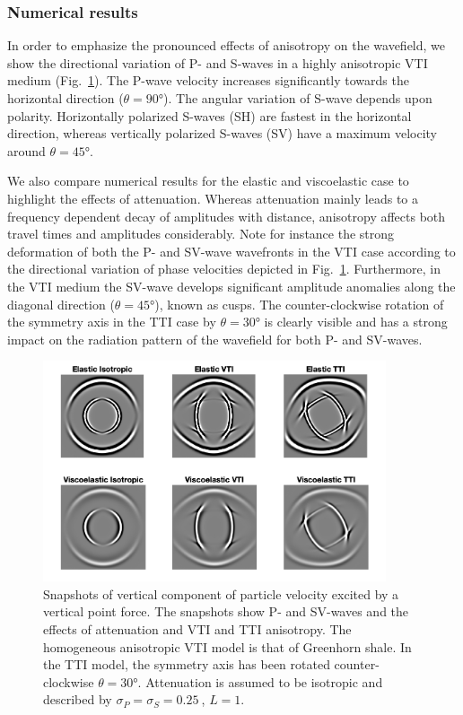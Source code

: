 \subsubsection{Numerical results}
In order to emphasize the pronounced effects of anisotropy on the wavefield, we show the directional variation of P- and S-waves in a highly anisotropic VTI medium (Fig.~\ref{fig:snapshots}). The P-wave velocity increases significantly towards the horizontal direction ($\theta = \ang{90}$). The angular variation of S-wave depends upon polarity. Horizontally polarized S-waves (SH) are fastest in the horizontal direction, whereas vertically polarized S-waves (SV) have a maximum velocity around $\theta = \ang{45}$.

We also compare numerical results for the elastic and viscoelastic
case to highlight the effects of attenuation. Whereas attenuation mainly leads to a frequency dependent decay of amplitudes with distance, anisotropy affects both travel times and amplitudes considerably. Note for instance the strong deformation of both the P- and SV-wave wavefronts in the VTI case according to the directional variation of phase velocities depicted in Fig.~\ref{fig:snapshots}. Furthermore, in the VTI medium the SV-wave develops significant amplitude anomalies along the diagonal direction ($\theta = \ang{45}$), known as cusps. The counter-clockwise rotation of the symmetry axis in the TTI case by $\theta = \ang{30}$ is clearly visible and has a strong impact on the radiation pattern of the wavefield for both P- and SV-waves.

\begin{figure}[h!]
    \centering
    \includegraphics[width=0.9\textwidth]{figures/modeling}
    \caption{Snapshots of vertical component of particle velocity excited by a vertical point force. The snapshots show P- and SV-waves and the effects of attenuation and VTI and TTI anisotropy. The homogeneous anisotropic VTI model is that of Greenhorn shale. In the TTI model, the symmetry axis has been rotated counter-clockwise $\theta = \ang{30}$. Attenuation is assumed to be isotropic and described by $\sigma_P=\sigma_S=\SI{0.25}{}$, $L=1$.}
    \label{fig:snapshots}
\end{figure}

